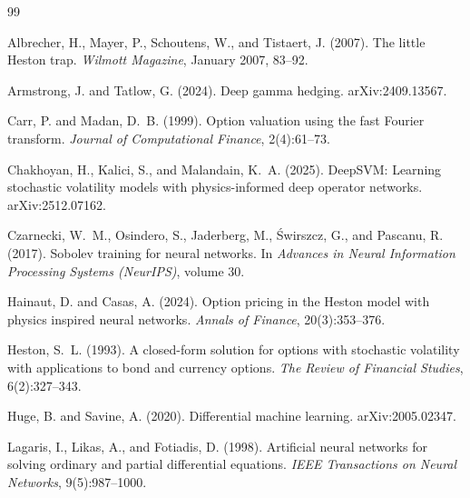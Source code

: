 \documentclass{article}
\begin{document}
\begin{thebibliography}{99}

Albrecher, H., Mayer, P., Schoutens, W., and Tistaert, J. (2007).
\newblock The little Heston trap.
\newblock \emph{Wilmott Magazine}, January 2007, 83--92.

Armstrong, J. and Tatlow, G. (2024).
\newblock Deep gamma hedging.
\newblock arXiv:2409.13567.

Carr, P. and Madan, D.~B. (1999).
\newblock Option valuation using the fast Fourier transform.
\newblock \emph{Journal of Computational Finance}, 2(4):61--73.

Chakhoyan, H., Kalici, S., and Malandain, K.~A. (2025).
\newblock DeepSVM: Learning stochastic volatility models with physics-informed
deep operator networks.
\newblock arXiv:2512.07162.

Czarnecki, W.~M., Osindero, S., Jaderberg, M., \'Swirszcz, G., and Pascanu, R. (2017).
\newblock Sobolev training for neural networks.
\newblock In \emph{Advances in Neural Information Processing Systems (NeurIPS)}, volume 30.

Hainaut, D. and Casas, A. (2024).
\newblock Option pricing in the Heston model with physics inspired neural networks.
\newblock \emph{Annals of Finance}, 20(3):353--376.

Heston, S.~L. (1993).
\newblock A closed-form solution for options with stochastic volatility with
applications to bond and currency options.
\newblock \emph{The Review of Financial Studies}, 6(2):327--343.

Huge, B. and Savine, A. (2020).
\newblock Differential machine learning.
\newblock arXiv:2005.02347.

Lagaris, I., Likas, A., and Fotiadis, D. (1998).
\newblock Artificial neural networks for solving ordinary and partial
differential equations.
\newblock \emph{IEEE Transactions on Neural Networks}, 9(5):987--1000.


\end{thebibliography}
\end{document}
